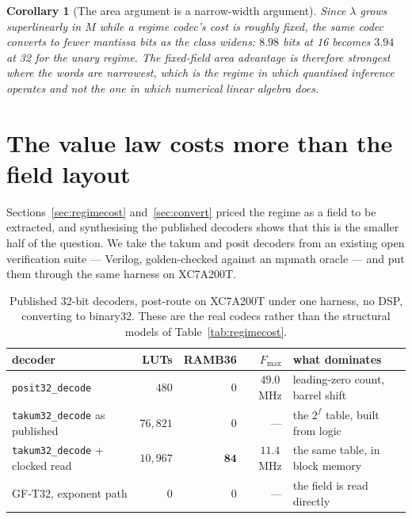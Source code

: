 \documentclass[11pt]{article}
\newtheorem{corollary}{Corollary}
\theoremstyle{definition}
\begin{document}
\begin{corollary}[The area argument is a narrow-width argument]
\label{cor:narrow}
Since $\lambda$ grows superlinearly in $M$ while a regime codec's cost is roughly
fixed, the same codec converts to fewer mantissa bits as the class widens:
$8.98$ bits at 16 becomes $3.94$ at 32 for the unary regime. The fixed-field area
advantage is therefore strongest where the words are narrowest, which is the
regime in which quantised inference operates and not the one in which numerical
linear algebra does.
\end{corollary}


\section{The value law costs more than the field layout}
\label{sec:valuelaw}

Sections~\ref{sec:regimecost} and~\ref{sec:convert} priced the regime as a field
to be extracted, and synthesising the published decoders shows that this is the
smaller half of the question. We take the takum and posit decoders from an
existing open verification suite --- Verilog, golden-checked against an mpmath
oracle --- and put them through the same harness on XC7A200T.

\begin{table}[t]\centering
\caption{Published 32-bit decoders, post-route on XC7A200T under one harness, no
DSP, converting to binary32. These are the real codecs rather than the structural
models of Table~\ref{tab:regimecost}.}
\label{tab:realcodecs}
\begin{tabular}{lrrrl}
\toprule
decoder & LUTs & RAMB36 & $F_{\max}$ & what dominates \\
\midrule
\texttt{posit32\_decode}          & $480$      & $0$  & $49.0$\,MHz & leading-zero count, barrel shift \\
\texttt{takum32\_decode} as published & $76{,}821$ & $0$  & ---         & the $2^{f}$ table, built from logic \\
\texttt{takum32\_decode} + clocked read & $10{,}967$ & $\mathbf{84}$ & $11.4$\,MHz & the same table, in block memory \\
GF-T32, exponent path             & $0$        & $0$  & ---         & the field is read directly \\
\bottomrule
\end{tabular}
\end{table}
\end{document}
